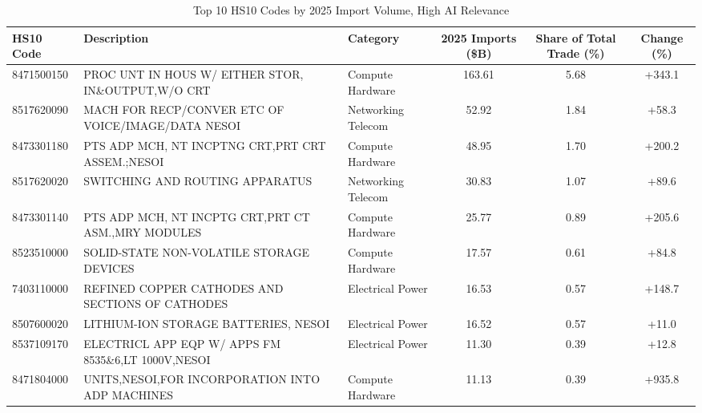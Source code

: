 \begin{table}[htbp]
\centering
\small
\caption{Top 10 HS10 Codes by 2025 Import Volume, High AI Relevance}
\label{tab:top10_high_relevance}
\setlength{\tabcolsep}{1.25mm}
\renewcommand{\arraystretch}{1.80}
\begin{tabular}{lp{5cm}lccc}
\toprule
HS10 Code & Description & Category & 2025 Imports (\$B) & Share of Total Trade (\%) & Change (\%) \\
\midrule
8471500150 & {\footnotesize PROC UNT IN HOUS W/ EITHER STOR, IN\&OUTPUT,W/O CRT} & Compute Hardware & 163.61 & 5.68 & +343.1 \\
8517620090 & {\footnotesize MACH FOR RECP/CONVER ETC OF VOICE/IMAGE/DATA NESOI} & Networking Telecom & 52.92 & 1.84 & +58.3 \\
8473301180 & {\footnotesize PTS ADP MCH, NT INCPTNG CRT,PRT CRT ASSEM.;NESOI} & Compute Hardware & 48.95 & 1.70 & +200.2 \\
8517620020 & {\footnotesize SWITCHING AND ROUTING APPARATUS} & Networking Telecom & 30.83 & 1.07 & +89.6 \\
8473301140 & {\footnotesize PTS ADP MCH, NT INCPTG CRT,PRT CT ASM.,MRY MODULES} & Compute Hardware & 25.77 & 0.89 & +205.6 \\
8523510000 & {\footnotesize SOLID-STATE NON-VOLATILE STORAGE DEVICES} & Compute Hardware & 17.57 & 0.61 & +84.8 \\
7403110000 & {\footnotesize REFINED COPPER CATHODES AND SECTIONS OF CATHODES} & Electrical Power & 16.53 & 0.57 & +148.7 \\
8507600020 & {\footnotesize LITHIUM-ION STORAGE BATTERIES, NESOI} & Electrical Power & 16.52 & 0.57 & +11.0 \\
8537109170 & {\footnotesize ELECTRICL APP EQP W/ APPS FM 8535\&6,LT 1000V,NESOI} & Electrical Power & 11.30 & 0.39 & +12.8 \\
8471804000 & {\footnotesize UNITS,NESOI,FOR INCORPORATION INTO ADP MACHINES} & Compute Hardware & 11.13 & 0.39 & +935.8 \\
\bottomrule
\end{tabular}
\end{table}
